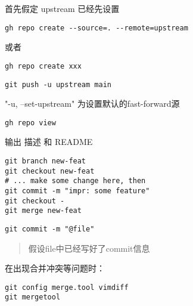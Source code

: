 
首先假定 upstream 已经先设置

\begin{lstlisting}
gh repo create --source=. --remote=upstream
\end{lstlisting}

或者

\begin{lstlisting}
gh repo create xxx
\end{lstlisting}


\begin{lstlisting}
git push -u upstream main
\end{lstlisting}

"-u, --set-upstream" 为设置默认的fast-forward源


\begin{lstlisting}
gh repo view
\end{lstlisting}

输出 描述 和 README



\begin{lstlisting}
git branch new-feat
git checkout new-feat
# ... make some change here, then
git commit -m "impr: some feature"
git checkout -
git merge new-feat
\end{lstlisting}


\begin{lstlisting}
git commit -m "@file"
\end{lstlisting}

\begin{quotation}
    假设file中已经写好了commit信息
\end{quotation}


在出现合并冲突等问题时：

\begin{lstlisting}
git config merge.tool vimdiff
git mergetool
\end{lstlisting}
